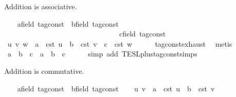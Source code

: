 \begin{isabellebody}
\isamarkupfalse%
%
\begin{isamarkuptext}%
Addition is associative.%
\end{isamarkuptext}\isamarkuptrue%
\ \ \isamarkupfalse%
\ a{\isacharcolon}{\isacharcolon}{\isacartoucheopen}{\isacharprime}{\isasymtau}{\isacharcolon}{\isacharcolon}field\ tag{\isacharunderscore}const{\isacartoucheclose}\ \ b{\isacharcolon}{\isacharcolon}{\isacartoucheopen}{\isacharprime}{\isasymtau}{\isacharcolon}{\isacharcolon}field\ tag{\isacharunderscore}const{\isacartoucheclose}\isanewline
\ \ \ \ \ \ \ \ \ \ \ \ \ \ \ \ \ \ \ \ \ \ \ \ \ \ \ \ \ \ \ \ c{\isacharcolon}{\isacharcolon}{\isacartoucheopen}{\isacharprime}{\isasymtau}{\isacharcolon}{\isacharcolon}field\ tag{\isacharunderscore}const{\isacartoucheclose}\isanewline
\ \ \isamarkupfalse%
\ u\ v\ w\ \ {\isacartoucheopen}a\ {\isacharequal}\ {\isasymtau}\isactrlsub c\isactrlsub s\isactrlsub t\ u{\isacartoucheclose}\ \ {\isacartoucheopen}b\ {\isacharequal}\ {\isasymtau}\isactrlsub c\isactrlsub s\isactrlsub t\ v{\isacartoucheclose}\ \ {\isacartoucheopen}c\ {\isacharequal}\ {\isasymtau}\isactrlsub c\isactrlsub s\isactrlsub t\ w{\isacartoucheclose}\isanewline
\ \ \ \ \isamarkupfalse%
\ tag{\isacharunderscore}const{\isachardot}exhaust\ \isamarkupfalse%
\ metis\isanewline
\ \ \isamarkupfalse%
\ {\isacartoucheopen}a\ {\isacharplus}\ b\ {\isacharplus}\ c\ {\isacharequal}\ a\ {\isacharplus}\ {\isacharparenleft}b\ {\isacharplus}\ c{\isacharparenright}{\isacartoucheclose}\isanewline
\ \ \ \ \isamarkupfalse%
\ {\isacharparenleft}simp\ add{\isacharcolon}\ TESL{\isachardot}plus{\isacharunderscore}tag{\isacharunderscore}const{\isachardot}simps{\isacharparenright}\isanewline
{}\isamarkupfalse%
%
\begin{isamarkuptext}%
Addition is commutative.%
\end{isamarkuptext}\isamarkuptrue%
\ \ \isamarkupfalse%
\ a{\isacharcolon}{\isacharcolon}{\isacartoucheopen}{\isacharprime}{\isasymtau}{\isacharcolon}{\isacharcolon}field\ tag{\isacharunderscore}const{\isacartoucheclose}\ \ b{\isacharcolon}{\isacharcolon}{\isacartoucheopen}{\isacharprime}{\isasymtau}{\isacharcolon}{\isacharcolon}field\ tag{\isacharunderscore}const{\isacartoucheclose}\isanewline
\ \ \isamarkupfalse%
\ u\ v\ \ {\isacartoucheopen}a\ {\isacharequal}\ {\isasymtau}\isactrlsub c\isactrlsub s\isactrlsub t\ u{\isacartoucheclose}\ \ {\isacartoucheopen}b\ {\isacharequal}\ {\isasymtau}\isactrlsub c\isactrlsub s\isactrlsub t\ v{\isacartoucheclose}\ \isamarkupfalse%

\end{isabellebody}
